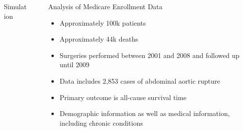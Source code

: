 \documentclass[final,plain]{beamer}
\newlength{\sepwid}
\newlength{\onecolwid}
\newlength{\twocolwid}
\newcommand{\bi}{\begin{itemize}}
\newcommand{\ei}{\end{itemize}}
\begin{document}
\begin{frame}[t]
\begin{columns}[t]
\begin{column}{\twocolwid}
\begin{columns}[t]
\begin{column}{\onecolwid}
\begin{block}{\Large Simulation}
    \end{block}



  \end{column}

  \end{columns}
  \end{column}

\begin{column}{\sepwid} \end{column}                 %

  \begin{column}{\twocolwid}
    \begin{exampleblock}{\Large Analysis of Medicare Enrollment Data}{
    \begin{center}
    \begin{minipage}[t]{0.7\onecolwid}
    \vspace*{0mm}

    \bi
    \item Approximately 100k patients
    \item Approximately 44k  deaths
    \item Surgeries performed between 2001 and 2008 and followed up until 2009
    \ei

    \end{minipage}
    \hspace{0.5\sepwid}
    \begin{minipage}[t]{0.8\onecolwid}
    \vspace*{0mm}

    \bi
    \item Data includes 2,853 cases of abdominal aortic rupture
    \item Primary outcome is all-cause survival time
    \item Demographic information as well as medical information, including chronic conditions
    \ei

    \end{minipage} \end{center}
    }
    \end{exampleblock}

    \vspace{1mm} %

    \begin{columns}[t]

      \begin{column}{\onecolwid}



\end{column}
\end{columns}
\end{column}
\end{columns}
\end{frame}
\end{document}
